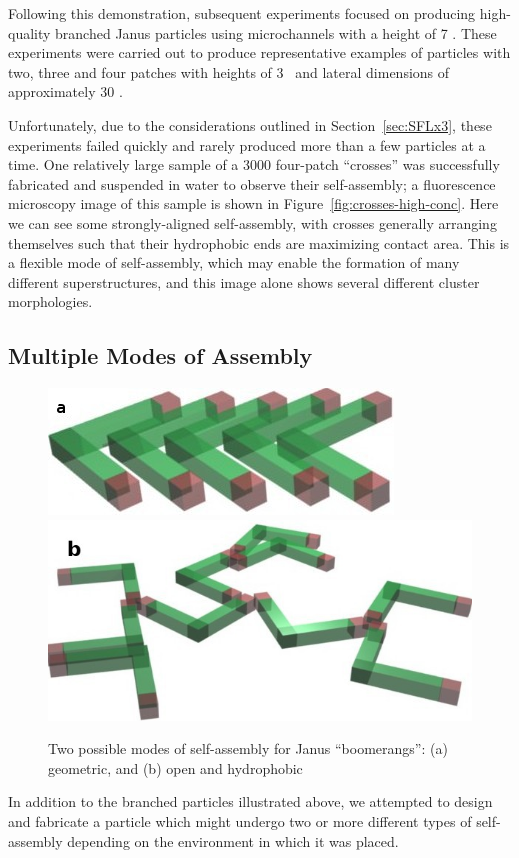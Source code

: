Following this demonstration, subsequent experiments focused on producing high-quality 
branched Janus particles using microchannels with a height of 7 \microns.  These experiments were carried
out to produce representative 
examples of particles with two, three and four patches with heights of
3 \microns~and lateral dimensions of approximately 30 \microns.  

Unfortunately, due to the considerations
outlined in Section~\ref{sec:SFLx3}, these experiments failed quickly and rarely produced more than a few
particles at a time.  One relatively large sample of a 3000 four-patch ``crosses'' was successfully fabricated 
and suspended in water to observe their self-assembly; a fluorescence 
microscopy image of this sample is shown in Figure~\ref{fig:crosses-high-conc}.  Here we can see 
some strongly-aligned self-assembly, with crosses generally arranging themselves such that
their hydrophobic ends are maximizing contact area.  This is a flexible mode of self-assembly, 
which may enable the formation of many different superstructures, and this image alone shows several different
cluster morphologies.

\subsection{Multiple Modes of Assembly}

\begin{figure}[h]
\begin{center}
\includegraphics[width=0.4\linewidth]{figures/complex-shapes/boomerangs-dense-assembly.jpg} \hfill \includegraphics[width=0.4\linewidth]{figures/complex-shapes/boomerangs-open-assembly.jpg}
\end{center}
\caption{Two possible modes of self-assembly for Janus ``boomerangs'': (a) geometric, and (b) open and hydrophobic}
\label{fig:boomerang-assembly}
\end{figure}

In addition to the branched particles illustrated above, we attempted to design and fabricate 
a particle which might undergo two or more different types of self-assembly depending on the environment
in which it was placed.  


